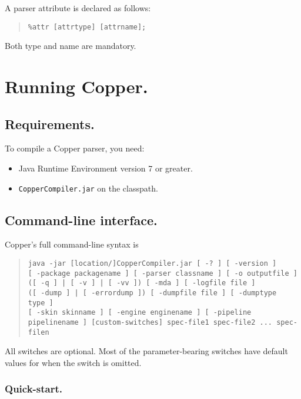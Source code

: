 \documentclass[12pt,english,twoside]{report}
\begin{document}
A parser attribute is declared as follows:

\begin{quote}
\texttt{\%attr {[}attrtype] {[}attrname];}
\end{quote}
Both type and name are mandatory.


\chapter{\label{cha:Running-Copper.}Running Copper.}


\section{Requirements.}

To compile a Copper parser, you need:

\begin{itemize}
\item Java Runtime Environment version 7 or greater.
\item \texttt{CopperCompiler.jar} on the classpath.
\end{itemize}

\section{Command-line interface.}

Copper's full command-line syntax is

\begin{quote}
\texttt{java -jar [location/]CopperCompiler.jar
[~-?~]
[~-version~]}\\
\texttt{[~-package packagename~]
[~-parser classname~]
[~-o outputfile~]}\\
\texttt{([~-q~] | [~-v~] | [~-vv~])
[~-mda~]
[~-logfile file~]}\\
\texttt{([~-dump~] | [~-errordump~])
[~-dumpfile file~]
[~-dumptype type~]}\\
\texttt{[~-skin skinname~]
[~-engine enginename~]
[~-pipeline pipelinename~]
[custom-switches]
spec-file1 spec-file2 ... spec-filen}
\end{quote}

All switches are optional. Most of the parameter-bearing switches have
default values for when the switch is omitted.

\subsection{Quick-start.}
\end{document}
